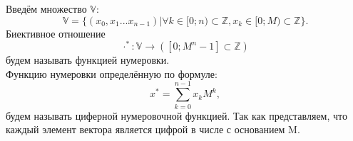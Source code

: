 Введём множество \(\mathbb{V}\):
\[ \mathbb{V} = \{(x_0, x_1 ... x_{n-1}) | \forall k \in [0;n) \subset \mathbb{Z}, x_k \in [0; M) \subset \mathbb{Z}\}.\]
Биективное отношение
\begin{equation}\label{number_function}
\cdot^* : \mathbb{V} \rightarrow ([0;M^n-1] \subset \mathbb{Z})
\end{equation}
будем называть функцией нумеровки.\\
Функцию нумеровки определённую по формуле:
\begin{equation}\label{number_function}
x^* = \sum_{k=0}^{n-1}x_k M^k,
\end{equation}
будем называть циферной нумеровочной функцией.
Так как представляем, что каждый элемент вектора является цифрой
в числе с основанием M.

